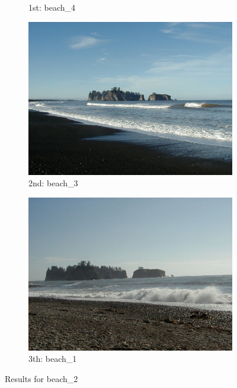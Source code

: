 \begin{itemize}
\begin{figure}[H]
\begin{subfigure}{0.25\textwidth}
	  \caption{1st: beach\_4}
	\end{subfigure}%
	\begin{subfigure}{0.25\textwidth}
        \centering
        \includegraphics[width=0.9\linewidth]{../input/beach_3.jpg}
        \caption{2nd: beach\_3}
    \end{subfigure}%
    \begin{subfigure}{0.25\textwidth}
	  \centering
	  \includegraphics[width=0.9\linewidth]{../input/beach_1.jpg}
	    \caption{3th: beach\_1}
	\end{subfigure}
    \caption{Results for beach\_2}
    \label{fig:results_beach_2}
\end{figure}


\end{itemize}
